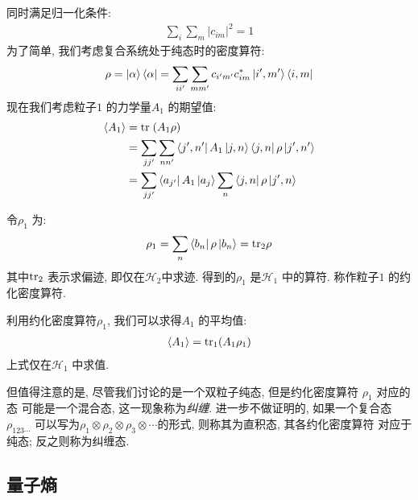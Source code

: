 同时满足归一化条件:
\begin{equation}
  \begin{aligned}
    \sum_{i} \sum_{m} |c_{im}|^{2} = 1
  \end{aligned}
\end{equation}
为了简单, 我们考虑复合系统处于纯态时的密度算符:
\begin{equation}
  \begin{aligned}
    \rho = \ket{\alpha}\bra{\alpha} = \sum_{ii'}\sum_{mm'}c_{i'm'}c_{im}^{*}\ket{i', m'}\bra{i, m}
  \end{aligned}
\end{equation}
现在我们考虑粒子$1$ 的力学量$A_1$ 的期望值:
\begin{equation}
  \begin{aligned}
    \langle A_1 \rangle &= {\rm tr}\; (A_1 \rho) \\
                        &= \sum_{jj'}\sum_{nn'}\bra{j', n'}A_1\ket{j, n}\bra{j, n}\rho \ket{j', n'}\\
                        &= \sum_{jj'}\bra{a_{j'}}A_1\ket{a_{j}}\sum_{n}\bra{j,n}\rho \ket{j', n}
  \end{aligned}
\end{equation}

令$\rho_1$ 为:
\begin{equation}
  \begin{aligned}
    \rho_1 = \sum_{n} \bra{b_{n}}\rho \ket{b_{n}} = {\rm tr}_2 \rho
  \end{aligned}
\end{equation}
其中${\rm tr}_{2}$ 表示求偏迹, 即仅在$\mathcal{H}_{2}$中求迹. 得到的$\rho_1$ 是$\mathcal{H}_{1}$ 中的算符.
称作粒子$1$ 的约化密度算符.

利用约化密度算符$\rho_1$, 我们可以求得$A_1$ 的平均值:
\begin{equation}
  \begin{aligned}
    \langle A_1 \rangle = {\rm tr}_{1}(A_1 \rho_1)
  \end{aligned}
\end{equation}
上式仅在$\mathcal{H}_{1}$ 中求值.

但值得注意的是, 尽管我们讨论的是一个双粒子纯态, 但是约化密度算符 $\rho_1$ 对应的态
可能是一个混合态, 这一现象称为\emph{纠缠}. 进一步不做证明的, 如果一个复合态$\rho_{123\cdots}$ 
可以写为$\rho_1\otimes \rho_2 \otimes \rho_3\otimes \cdots$的形式, 则称其为直积态, 其各约化密度算符
对应于纯态; 反之则称为纠缠态.

\subsection{量子熵}

